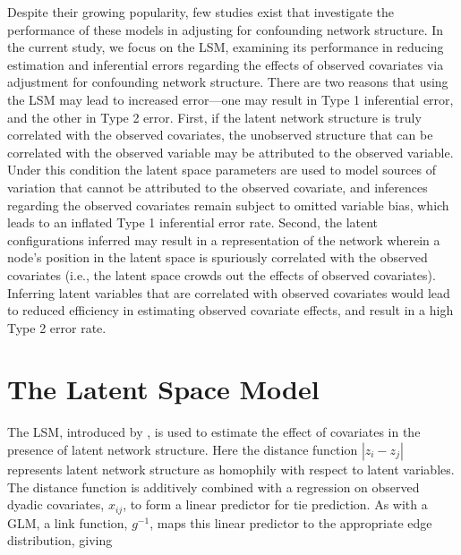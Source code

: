 \documentclass[11pt]{article}
\begin{document}
Despite their growing popularity, few studies exist that investigate
the performance of these models in adjusting for confounding network
structure. In the current study, we focus on the LSM, examining its
performance in reducing estimation and inferential errors regarding
the effects of observed covariates via adjustment for confounding
network structure. There are two reasons that using the LSM may lead
to increased error---one may result in Type 1 inferential error, and
the other in Type 2 error. First, if the latent
network structure is truly correlated with the observed covariates,
the unobserved structure that can be correlated with the observed
variable may be attributed to the observed variable. Under this
condition the latent space parameters are used to model sources of
variation that cannot be attributed to the observed covariate, and
inferences regarding the observed covariates remain subject to omitted
variable bias, which leads to an inflated Type 1 inferential error
rate. Second, the latent configurations inferred may result in a
representation of the network wherein a node's position in the latent
space is spuriously correlated with the observed covariates (i.e., the latent space crowds out the effects of observed covariates). Inferring
latent variables that are correlated with observed covariates would
lead to reduced efficiency in estimating observed covariate effects,
and result in a high Type 2 error rate.



\section{The Latent Space Model}

The LSM, introduced by \citet{hoff2002latent}, is used to estimate the
effect of covariates in the presence of latent network structure. Here
the distance function $|z_i - z_j|$ represents latent network
structure as homophily with respect to latent variables.  The distance
function is additively combined with a regression on observed dyadic
covariates, $x_{ij}$, to form a linear predictor for tie prediction.
As with a GLM, a link function, $g^{-1}$, maps this linear predictor
to the appropriate edge distribution, giving
\end{document}
